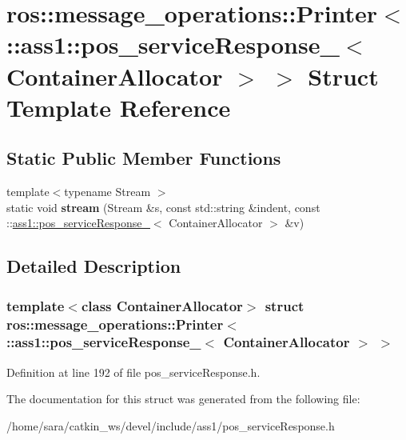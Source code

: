\hypertarget{structros_1_1message__operations_1_1Printer_3_01_1_1ass1_1_1pos__serviceResponse___3_01ContainerAllocator_01_4_01_4}{}\section{ros\+:\+:message\+\_\+operations\+:\+:Printer$<$ \+:\+:ass1\+:\+:pos\+\_\+service\+Response\+\_\+$<$ Container\+Allocator $>$ $>$ Struct Template Reference}
\label{structros_1_1message__operations_1_1Printer_3_01_1_1ass1_1_1pos__serviceResponse___3_01ContainerAllocator_01_4_01_4}
\subsection*{Static Public Member Functions}
\begin{DoxyCompactItemize}
\item 
\mbox{\label{structros_1_1message__operations_1_1Printer_3_01_1_1ass1_1_1pos__serviceResponse___3_01ContainerAllocator_01_4_01_4_a57ca054a4260e3671a65dd18291eacf2}} 
{\footnotesize template$<$typename Stream $>$ }\\static void {\bfseries stream} (Stream \&s, const std\+::string \&indent, const \+::\hyperlink{structass1_1_1pos__serviceResponse__}{ass1\+::pos\+\_\+service\+Response\+\_\+}$<$ Container\+Allocator $>$ \&v)
\end{DoxyCompactItemize}


\subsection{Detailed Description}
\subsubsection*{template$<$class Container\+Allocator$>$\newline
struct ros\+::message\+\_\+operations\+::\+Printer$<$ \+::ass1\+::pos\+\_\+service\+Response\+\_\+$<$ Container\+Allocator $>$ $>$}



Definition at line 192 of file pos\+\_\+service\+Response.\+h.



The documentation for this struct was generated from the following file\+:\begin{DoxyCompactItemize}
\item 
/home/sara/catkin\+\_\+ws/devel/include/ass1/pos\+\_\+service\+Response.\+h\end{DoxyCompactItemize}
